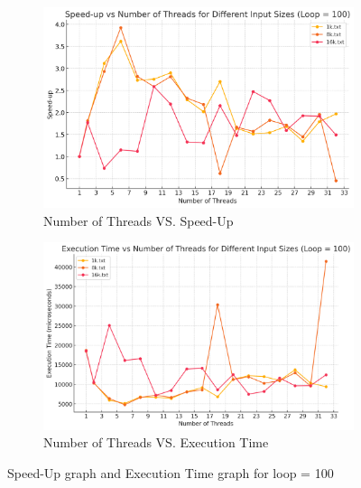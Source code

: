 \documentclass[letterpaper,12pt]{article}
\theoremstyle{remark}
\begin{document}
\begin{figure}[H]
    \centering
    \begin{subfigure}[t]{0.48\textwidth}  %
        \centering
        \includegraphics[width=\textwidth]{codioLoop100.png}
        \caption{Number of Threads VS. Speed-Up}
        \label{fig:ThreadVsSpeedUp1}
    \end{subfigure}
    \hfill  %
    \begin{subfigure}[t]{0.48\textwidth}  %
        \centering
        \includegraphics[width=\textwidth]{codioExecutionTimeLoop100.png}
        \caption{Number of Threads VS. Execution Time}
        \label{fig:ThreadVsExecutionTime}
    \end{subfigure}
    \caption{Speed-Up graph and Execution Time graph for loop = 100}
    \label{fig:ThreadVsComparison}
\end{figure}
\hfill  %
\end{document}
